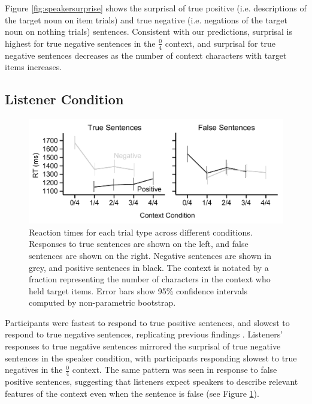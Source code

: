 \documentclass[man, noapacite]{apa2}
\begin{document}
Figure \ref{fig:speakersurprise} shows the surprisal of true positive (i.e. descriptions of the target noun on item trials) and true negative (i.e. negations of the target noun on nothing trials) sentences.  Consistent with our predictions, surprisal is highest for true negative sentences in the $\frac{0}{4}$ context, and surprisal for true negative sentences decreases as the number of context characters with target items increases.

\subsection{Listener Condition}

\begin{figure}[t]
\begin{center} 
\includegraphics[width=5in]{figures/rts_mod.pdf}
\caption{\label{fig:listenerrt} Reaction times for each trial type across different conditions. Responses to true sentences are shown on the left, and false sentences are shown on the right.  Negative sentences are shown in grey, and positive sentences in black.  The context is notated by a fraction representing the number of characters in the context who held target items. Error bars show 95\% confidence intervals computed by non-parametric bootstrap.}
\end{center} 
\end{figure}

Participants were fastest to respond to true positive sentences, and slowest to respond to true negative sentences, replicating previous findings \cite{hclark1972}.  Listeners' responses to true negative sentences mirrored the surprisal of true negative sentences in the speaker condition, with participants responding slowest to true negatives in the $\frac{0}{4}$ context.  The same pattern was seen in response to false positive sentences, suggesting that listeners expect speakers to describe relevant features of the context even when the sentence is false (see Figure \ref{fig:listenerrt}).  
\end{document}
